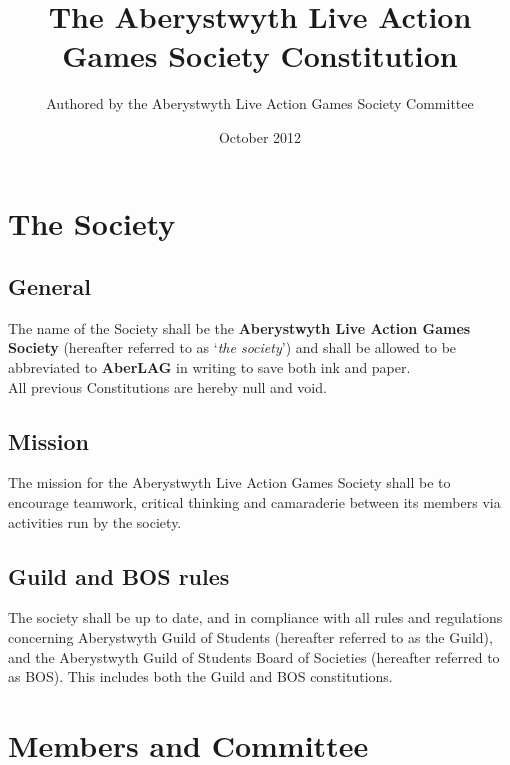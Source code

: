 \documentclass{report}
\newcommand{\society}{Aberystwyth Live Action Games Society}
\begin{document}
\title{The \society{} Constitution}
\author{Authored by the \society{} Committee}
\date{October 2012}
\maketitle{}

\tableofcontents
\newpage

\chapter{The Society}

\section{General}

The name of the Society shall be the \textbf{\society} (hereafter referred to as `{\em the society}') and shall be allowed to be abbreviated to \textbf{AberLAG} in writing to save both ink and paper. \\

\noindent All previous Constitutions are hereby null and void.

\section{Mission}

The mission for the \society{} shall be to encourage teamwork, critical thinking and camaraderie between its members via activities run by the society.

\section{Guild and BOS rules}

The society shall be up to date, and in compliance with all rules and regulations concerning Aberystwyth Guild of Students (hereafter referred to as the Guild), and the Aberystwyth Guild of Students Board of Societies (hereafter referred to as BOS). This includes both the Guild and BOS constitutions.

\chapter{Members and Committee}
\end{document}
